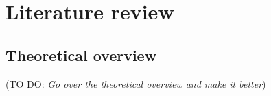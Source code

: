 \documentclass[12pt]{article}
\newcommand{\todo }[1]{({\color{red}\sc TO DO: \textit{#1}})}
\begin{document}



\section{Literature review}
\subsection{Theoretical overview}
\todo{Go over the theoretical overview and make it better}

\end{document}
